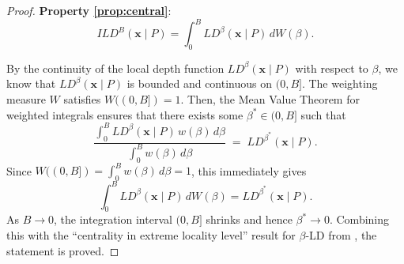 \documentclass[final,3p,times]{elsarticle}
\newcommand{\vecx}{\mathbf{x}}
\begin{document}
\begin{proof}\textbf{Property \ref{prop:central}}:
\[
ILD^B(\vecx \mid P) = \int_0^B LD^\beta(\vecx \mid P) \, dW(\beta).
\]

By the continuity of the local depth function $LD^\beta(\vecx \mid P)$ with respect to $\beta$, we know that $LD^\beta(\vecx \mid P)$ is bounded and continuous on $(0, B]$. The weighting measure $W$ satisfies $W((0, B]) = 1$. Then, the Mean Value Theorem for weighted integrals ensures that there exists some $\beta^*\in(0,B]$ such that
$$
\frac{\int_0^B LD^\beta(\vecx\mid P)\,w(\beta)\,d\beta}
     {\int_0^B w(\beta)\,d\beta}
\;=\;
LD^{\beta^*}(\vecx\mid P).
$$
Since $W((0,B])=\int_0^B w(\beta)\,d\beta=1$, this immediately gives
$$
\int_0^B LD^\beta(\vecx\mid P)\,dW(\beta)
=LD^{\beta^*}(\vecx\mid P).
$$
As $B\to0$, the integration interval $(0,B]$ shrinks and hence $\beta^*\to0$. Combining this with the ``centrality in extreme locality level'' result for $\beta$-LD from \cite{paindaveine2013depth}, the statement is proved.

\end{proof}
\end{document}
